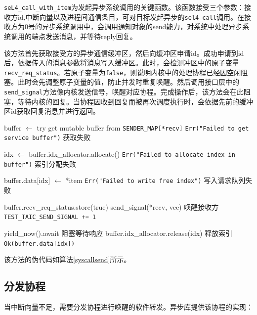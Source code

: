 \texttt{seL4\_call\_with\_item}为发起异步系统调用的关键函数。该函数接受三个参数：接收方id,中断向量以及进程间通信条目，可对目标发起异步的\texttt{sel4\_call}调用。在接收方为0号的异步系统调用中，会调用通知对象的send能力，对系统中处理异步系统调用的端点发送消息，并等待reply回复。

该方法首先获取接受方的异步通信缓冲区，然后向缓冲区申请id。成功申请到id后，依据传入的消息参数将消息写入缓冲区。此时，会检测冲区中的原子变量\texttt{recv\_req\_status}。若原子变量为\texttt{false}，则说明内核中的处理协程已经因空闲阻塞。此时会先调整原子变量的值，防止并发时重复唤醒。然后调用接口层中的\texttt{send\_signal}方法像内核发送信号，唤醒对应协程。完成操作后，该方法会在此阻塞，等待内核的回复。当协程因收到回复而被再次调度执行时，会依据先前的缓冲区id获取回复消息并进行返回。

\begin{algorithm}
  \caption{异步过程调用发送函数}\label{syscallsend}
  \begin{algorithmic}[0]  %
    \State buffer $\gets$ try get mutable buffer from \texttt{SENDER\_MAP[*recv]}
    \State \Return \texttt{Err("Failed to get service buffer")} \Comment 获取失败
    \EndIf

    \State idx $\gets$ buffer.idx\_allocator.allocate()
    \State \Return \texttt{Err("Failed to allocate index in buffer")} \Comment 索引分配失败
    \EndIf

    \State buffer.data[idx] $\gets$ *item
    \State \Return \texttt{Err("Failed to write free index")} \Comment 写入请求队列失败
    \EndIf

    \State buffer.recv\_req\_status.store(true)
    \State send\_signal(*recv, vec) \Comment 唤醒接收方
    \State \texttt{TEST\_TAIC\_SEND\_SIGNAL += 1}
    \EndIf

    \State yield\_now().await \Comment 阻塞等待响应
    \State buffer.idx\_allocator.release(idx) \Comment 释放索引
    \State \Return \texttt{Ok(buffer.data[idx])}
  \end{algorithmic}
\end{algorithm}

该方法的伪代码如算法\ref{syscallsend}所示。

\subsection{分发协程}
当中断向量不足，需要分发协程进行唤醒的软件转发。异步库提供该协程的实现：

